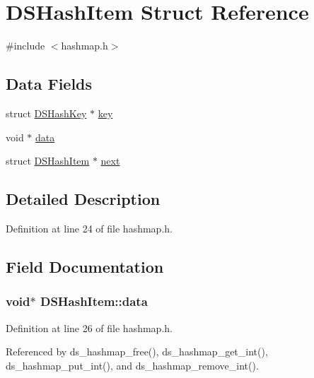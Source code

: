 \hypertarget{structDSHashItem}{}\section{D\+S\+Hash\+Item Struct Reference}
\label{structDSHashItem}


{\ttfamily \#include $<$hashmap.\+h$>$}

\subsection*{Data Fields}
\begin{DoxyCompactItemize}
\item 
struct \hyperlink{structDSHashKey}{D\+S\+Hash\+Key} $\ast$ \hyperlink{structDSHashItem_ad2459decab1855fa936947d162e4e6bf}{key}
\item 
void $\ast$ \hyperlink{structDSHashItem_ac1dca8ed8ae15bc91ab699b5aff11e7d}{data}
\item 
struct \hyperlink{structDSHashItem}{D\+S\+Hash\+Item} $\ast$ \hyperlink{structDSHashItem_a965af2d48aea3abb870419246b3348b1}{next}
\end{DoxyCompactItemize}


\subsection{Detailed Description}


Definition at line 24 of file hashmap.\+h.



\subsection{Field Documentation}
\subsubsection[{\texorpdfstring{data}{data}}]{\setlength{\rightskip}{0pt plus 5cm}void$\ast$ D\+S\+Hash\+Item\+::data}\hypertarget{structDSHashItem_ac1dca8ed8ae15bc91ab699b5aff11e7d}{}\label{structDSHashItem_ac1dca8ed8ae15bc91ab699b5aff11e7d}


Definition at line 26 of file hashmap.\+h.



Referenced by ds\+\_\+hashmap\+\_\+free(), ds\+\_\+hashmap\+\_\+get\+\_\+int(), ds\+\_\+hashmap\+\_\+put\+\_\+int(), and ds\+\_\+hashmap\+\_\+remove\+\_\+int().

